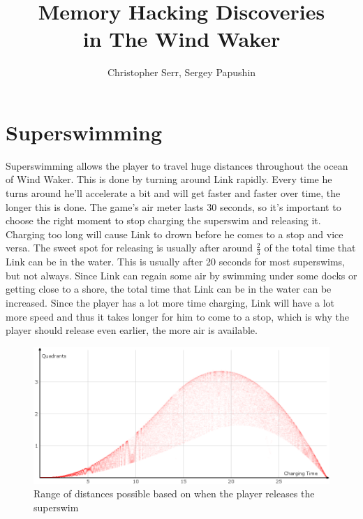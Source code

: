 \documentclass[titlepage,12pt,a4paper]{article}
\title{Memory Hacking Discoveries\\in The Wind Waker}
\author{Christopher Serr, Sergey Papushin}
\let\stdsection\section
\renewcommand\section{\newpage\stdsection}
\begin{document}
\maketitle


\tableofcontents
\clearpage

\section{Superswimming}
Superswimming allows the player to travel huge distances throughout the ocean of Wind Waker. This is done by turning around Link rapidly. Every time he turns around he'll accelerate a bit and will get faster and faster over time, the longer this is done. The game's air meter lasts 30 seconds, so it's important to choose the right moment to stop charging the superswim and releasing it. Charging too long will cause Link to drown before he comes to a stop and vice versa. The sweet spot for releasing is usually after around $\frac{2}{3}$ of the total time that Link can be in the water. This is usually after 20 seconds for most superswims, but not always. Since Link can regain some air by swimming under some docks or getting close to a shore, the total time that Link can be in the water can be increased. Since the player has a lot more time charging, Link will have a lot more speed and thus it takes longer for him to come to a stop, which is why the player should release even earlier, the more air is available.

\begin{figure}[!htb]
	\centering
	\includegraphics[width=\textwidth]{SSDistance}
	\caption{Range of distances possible based on when the player releases the superswim}
	\label{fig:SSDistance}
\end{figure}
\end{document}
